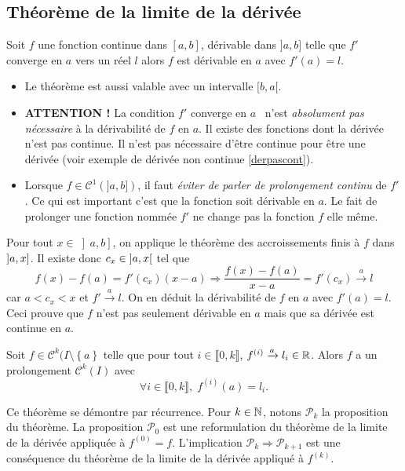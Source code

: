 \subsection{Théorème de la limite de la dérivée}
\begin{thm}
 Soit $f$ une fonction continue dans $[a,b]$, dérivable dans $]a,b]$ telle que $f'$ converge en $a$ vers un réel $l$ alors $f$ est dérivable en $a$ avec $f'(a)=l$.
\end{thm}
\begin{rems}
\begin{itemize}
 \item Le théorème est aussi valable avec un intervalle $[b,a[$.
 
 \item \textbf{ATTENTION !} La condition \og$f'$ converge en $a$\fg~ n'est \emph{absolument pas nécessaire} à la dérivabilité de $f$ en $a$. Il existe des fonctions dont la dérivée n'est pas continue. Il n'est pas nécessaire d'être continue pour être une dérivée (voir exemple de dérivée non continue \ref{derpascont}).

 \item Lorsque $f\in\mathcal C^1(]a,b])$, il faut \emph{éviter de parler de prolongement continu} de $f'$. Ce qui est important c'est que la fonction soit dérivable en $a$. Le fait de prolonger une fonction nommée $f'$ ne change pas la fonction $f$ elle même. 
\end{itemize}
\end{rems}
\begin{demo}
 Pour tout $x\in \left] a,b\right]$, on applique le théorème des accroissements finis à $f$ dans $\left] a , x \right]$. Il existe donc $c_x \in \left] a , x \right[$ tel que 
\[
f(x) - f(a) = f'(c_x)(x-a) \Rightarrow \frac{f(x) - f(a)}{x-a} = f'(c_x) \xrightarrow{a} l
\]
car $a<c_x<x$ et $f' \xrightarrow{a} l$. On en déduit la dérivabilité de $f$ en $a$ avec $f'(a) = l$. Ceci prouve que $f$ n'est pas seulement dérivable en $a$ mais que sa dérivée est continue en $a$.
\end{demo}

\begin{thm}
Soit $f\in \mathcal{C}^k(I\setminus\left\lbrace a\right\rbrace$ telle que pour tout $i\in \llbracket 0, k \rrbracket$, $f^{(i)} \xrightarrow{a} l_i\in \mathbb{R}$. Alors $f$ a un prolongement $\mathcal{C}^k(I)$ avec 
\[
 \forall i \in \llbracket 0,k \rrbracket,\; f^{(i)}(a) = l_i.
\]
\end{thm}
\begin{demo}
 Ce théorème se démontre par récurrence. Pour $k\in \mathbb{N}$, notons $\mathcal{P}_k$ la proposition du théorème. La proposition $\mathcal{P}_0$ est une reformulation du théorème de la limite de la dérivée appliquée à $f^{(0)}=f$.\newline
 L'implication $\mathcal{P}_k \Rightarrow \mathcal{P}_{k+1}$ est une conséquence du théorème de la limite de la dérivée appliqué à $f^{(k)}$.
\end{demo}


